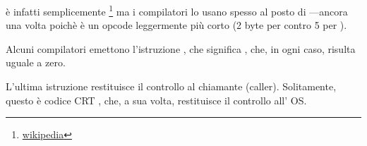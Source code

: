 
\XOR è infatti semplicemente \footnote{\href{http://go.yurichev.com/17118}{wikipedia}} ma i compilatori lo usano spesso al posto di 
---ancora una volta poichè è un opcode leggermente più corto (2 byte per \XOR contro 5 per \MOV).

Alcuni compilatori emettono l'istruzione , che significa  \EAX {} \EAX, che, in ogni caso, risulta uguale a zero.

L'ultima istruzione \RET restituisce il controllo al chiamante (\gls{caller}). Solitamente, questo è codice \CCpp \ac{CRT} , che, a sua volta, restituisce il controllo all' \ac{OS}.

